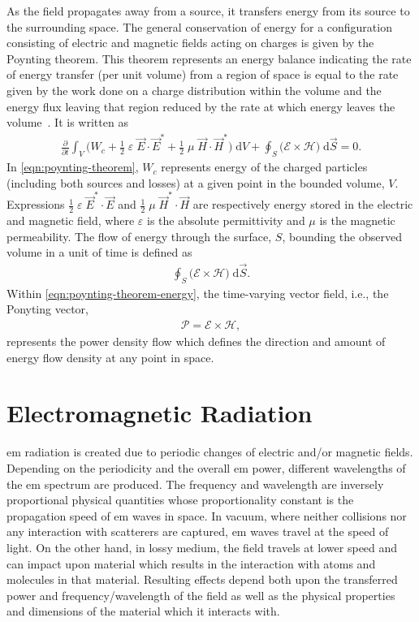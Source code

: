 As the field propagates away from a source, it transfers
energy from its source to the surrounding space.
The general conservation of energy for a configuration consisting of electric and magnetic fields acting on charges is given by the Poynting theorem.
This theorem represents an energy balance indicating the rate of energy transfer (per unit volume) from a region of space is equal to the rate given by the work done on a charge distribution within the volume and the energy flux leaving that region reduced by the rate at which energy leaves the volume~\cite{Jackson1998Classical}.
It is written as~\cite{Durney1986Radiofrequency}
\begin{align}
    \label{eqn:poynting-theorem}
    \frac{\partial}{\partial t}\int_V \big( W_c + \frac{1}{2} \; \varepsilon \; \vec E \cdot \vec E^* + \frac{1}{2} \; \mu \; \vec H \cdot \vec H^* \big) \; \mathrm{d}V + \oint_S \big( \mathcal{E} \times \mathcal{H} \big) \; \mathrm{d} \vec S = 0.
\end{align}
In \cref{eqn:poynting-theorem}, $W_c$ represents energy of the charged particles (including both sources and losses) at a given point in the bounded volume, $V$.
Expressions $\frac{1}{2} \; \varepsilon \; \vec E^* \cdot \vec E$ and $\frac{1}{2} \; \mu \; \vec H^* \cdot \vec H$ are respectively energy stored in the electric and magnetic field, where $\varepsilon$ is the absolute permittivity and $\mu$ is the magnetic permeability.
The flow of energy through the surface, $S$, bounding the observed volume in a unit of time is defined as
\begin{align}
    \label{eqn:poynting-theorem-energy}
    \oint_S \big( \mathcal{E} \times \mathcal{H} \big) \; \mathrm{d} \vec S.
\end{align}
Within \cref{eqn:poynting-theorem-energy}, the time-varying vector field, i.e., the Ponyting vector,
\begin{align}
    \label{eqn:poynting-vector}
    \mathcal{P} = \mathcal{E} \times \mathcal{H},
\end{align}
represents the power density flow which defines the direction and amount of energy flow density at any point in space.

\section{Electromagnetic Radiation}
\gls{em} radiation is created due to periodic changes of electric and/or magnetic fields.
Depending on the periodicity and the overall \gls{em} power, different wavelengths of the \gls{em} spectrum are produced.
The frequency and wavelength are inversely proportional physical quantities whose proportionality constant is the propagation speed of \gls{em} waves in space.
In vacuum, where neither collisions nor any interaction with scatterers are captured, \gls{em} waves travel at the speed of light.
On the other hand, in lossy medium, the field travels at lower speed and can impact upon material which results in the interaction with atoms and molecules in that material.
Resulting effects depend both upon the transferred power and frequency/wavelength of the field as well as the physical properties and dimensions of the material which it interacts with.

